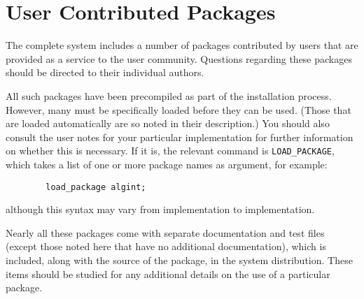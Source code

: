 \chapter{User Contributed Packages} 
\label{chap-user}
The complete {\REDUCE} system includes a number of packages contributed by
users that are provided as a service to the user community.  Questions
regarding these packages should be directed to their individual authors.

All such packages have been precompiled as part of the installation process.
However, many must be specifically loaded before they can be used. (Those
that are loaded automatically are so noted in their description.) You should
also consult the user notes for your particular implementation for further
information on whether this is necessary.  If it is, the relevant command is
{\tt LOAD\_PACKAGE}, which takes a list of one or
more package names as argument, for example:

\begin{verbatim}
        load_package algint;
\end{verbatim}
although this syntax may vary from implementation to implementation.

Nearly all these packages come with separate documentation and test files
(except those noted here that have no additional documentation), which is
included, along with the source of the package, in the {\REDUCE} system
distribution.  These items should be studied for any additional details on
the use of a particular package.

